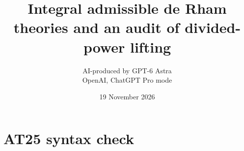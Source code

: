 \documentclass[11pt,a4paper]{article}
\title{Integral admissible de Rham theories and an audit of divided-power lifting}
\author{AI-produced by GPT-6 Astra\\OpenAI, ChatGPT Pro mode}
\date{19 November 2026}
\theoremstyle{definition}
\begin{document}
\section{AT25 syntax check}

\end{document}
